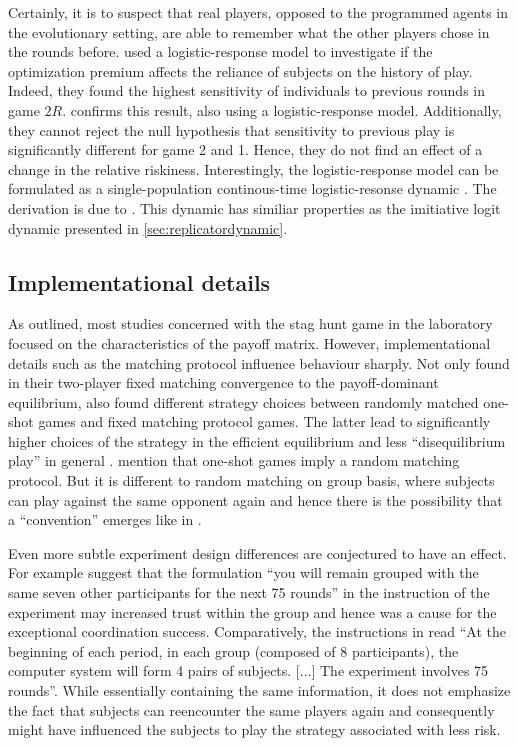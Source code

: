 Certainly, it is to suspect that real players, opposed
to the programmed agents in the evolutionary setting, are able to remember
what the other players chose in the rounds before.  
\textcite{battalio_optimization_2001} used a logistic-response model to
investigate if the optimization premium affects the reliance of subjects
on the history of play. Indeed, they found the highest sensitivity of 
individuals to previous rounds in game $2R$.
\textcite{dubois_optimization_2012} confirms this result, also using 
a logistic-response model. Additionally, they cannot reject the null
hypothesis that sensitivity to previous play is significantly different for
game 2 and 1. Hence, they do not find an effect of a change in the
relative riskiness. Interestingly, the logistic-response model can be
formulated as a single-population continous-time logistic-resonse dynamic
\parencite[752]{battalio_optimization_2012}. The derivation is due to
\textcite{fudenberg_theory_1998}. This dynamic has similiar properties as 
the imitiative logit dynamic presented in \ref{sec:replicatordynamic}.


\subsection{Implementational details}
As outlined, most studies concerned with the stag hunt game in the 
laboratory focused on the characteristics of the payoff matrix. 
However, implementational details 
such as the matching protocol influence behaviour sharply. Not only 
\textcite{van_huyck_tacit_1990} found in their two-player fixed matching
convergence to the payoff-dominant equilibrium, 
\textcite{clark_repetition_2001} also found different strategy 
choices between randomly matched one-shot games and fixed matching protocol 
games. The latter lead to significantly higher choices of the strategy 
in the efficient equilibrium and less ``disequilibrium play'' in general
\parencite[]{clark_repetition_2001}. 
\textcite{devetag_when_2007} mention that one-shot games imply a 
random matching protocol. But it is different to random matching on group
basis, where subjects can play against the same opponent again 
and hence there is the possibility that a ``convention'' emerges like in 
\textcite{rankin_strategic_2000}.

Even more subtle experiment design differences are conjectured to have an
effect. For example \textcite{devetag_when_2007} suggest that the formulation
``you will remain grouped with the same seven other participants for the next
75 rounds'' in the instruction of the \textcite{rankin_strategic_2000}  
experiment may increased trust within the group and hence was a 
cause for the exceptional coordination success. Comparatively, the 
instructions in \textcite{dubois_optimization_2012} read ``At the beginning
of each period, in each group (composed of 8 participants), the computer
system will form 4 pairs of subjects. [...] The experiment 
involves 75 rounds''\parencite[378]{dubois_optimization_2012}. 
While essentially containing the same information,
it does not emphasize the fact that subjects can reencounter the same 
players again and consequently might have influenced the subjects to play
the strategy associated with less risk.

